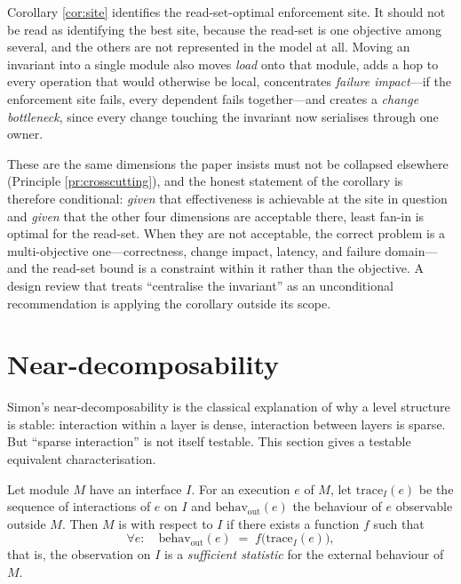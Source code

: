 \begin{remark}\label{rmk:central-multi}
Corollary \ref{cor:site} identifies the read-set-optimal enforcement site. It should not be read as
identifying the best site, because the read-set is one objective among several, and the others are
not represented in the model at all. Moving an invariant into a single module also moves \emph{load}
onto that module, adds a hop to every operation that would otherwise be local, concentrates
\emph{failure impact}---if the enforcement site fails, every dependent fails together---and creates a
\emph{change bottleneck}, since every change touching the invariant now serialises through one
owner.

These are the same dimensions the paper insists must not be collapsed elsewhere
(Principle \ref{pr:crosscutting}), and the honest statement of the corollary is therefore
conditional: \emph{given} that effectiveness is achievable at the site in question and \emph{given}
that the other four dimensions are acceptable there, least fan-in is optimal for the read-set. When
they are not acceptable, the correct problem is a multi-objective one---correctness, change impact,
latency, and failure domain---and the read-set bound is a constraint within it rather than the
objective. A design review that treats ``centralise the invariant'' as an unconditional
recommendation is applying the corollary outside its scope.
\end{remark}

\section{Near-decomposability}\label{sec:neardecomp}

Simon's near-decomposability \cite{simon1962} is the classical explanation of why a level
structure is stable: interaction within a layer is dense, interaction between layers is
sparse. But ``sparse interaction'' is not itself testable. This section gives a testable
equivalent characterisation.

\begin{definition}\label{def:neardecomp}
Let module $M$ have an interface $I$. For an execution $e$ of $M$, let
$\mathrm{trace}_I(e)$ be the sequence of interactions of $e$ on $I$ and
$\mathrm{behav}_{\mathrm{out}}(e)$ the behaviour of $e$ observable outside $M$. Then $M$ is
 with respect to $I$ if there exists a function $f$ such that
\begin{equation}\label{eq:neardecomp}
\forall e:\quad \mathrm{behav}_{\mathrm{out}}(e) \;=\;
f\bigl(\mathrm{trace}_I(e)\bigr),
\end{equation}
that is, the observation on $I$ is a \emph{sufficient statistic} for the external behaviour
of $M$.
\end{definition}


